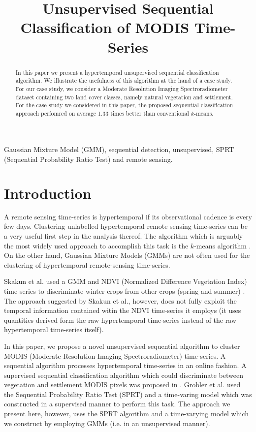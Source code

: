 \documentclass{article}
\title{Unsupervised Sequential Classification of MODIS Time-Series}
\begin{document}
%
\maketitle
%
\begin{abstract}
In this paper we present a hypertemporal unsupervised sequential classification algorithm.  
We illustrate the usefulness of this algorithm at the hand of a case study. For our case study, we consider a Moderate Resolution Imaging Spectroradiometer dataset containing two land cover classes, namely natural vegetation and settlement. For the 
case study we considered in this paper, the proposed sequential classification approach perfomred on average 1.33 times better than conventional $k$-means.
\end{abstract}
%
\begin{keywords}
Gaussian Mixture Model (GMM), sequential detection, unsupervised, SPRT (Sequential Probability Ratio Test) and remote sensing.
\end{keywords}
%

\section{Introduction}
\label{sec:intro}
A remote sensing time-series is hypertemporal if its observational cadence is every few days. Clustering unlabelled hypertemporal remote sensing time-series can be a very useful first step in the analysis thereof. The algorithm which is arguably the most widely used approach to accomplish this task is the $k$-means algorithm \cite{viovy2000}. On the other hand, Gaussian Mixture Models (GMMs) are not often used for the clustering of hypertemporal remote-sensing time-series.

Skakun et al. used a GMM and NDVI (Normalized Difference Vegetation Index) time-series to discriminate winter crops from other crops (spring and summer) \cite{skakun2017}. The approach suggested by Skakun et al., however, does not fully exploit the temporal information contained witin the NDVI time-series it employs (it uses quantities derived form the raw hypertemporal time-series instead of the raw hypertemporal time-series itself).

In this paper, we propose a novel unsupervised sequential algorithm to cluster MODIS (Moderate Resolution Imaging Spectroradiometer) time-series. A sequential algorithm processes hypertemporal time-series in an online fashion. A supervised sequential classification algorithm which could discriminate 
between vegetation and settlement MODIS pixels was proposed in \cite{ackermann2011t,grobler2012c}. Grobler et al. used the Sequential Probability Ratio Test (SPRT) and a time-varing model which was constructed in a supervised manner to perform this task. The approach we present here, however, uses the SPRT algorithm and a time-varying model which we construct by employing GMMs (i.e. in an unsupervised manner).
\end{document}
